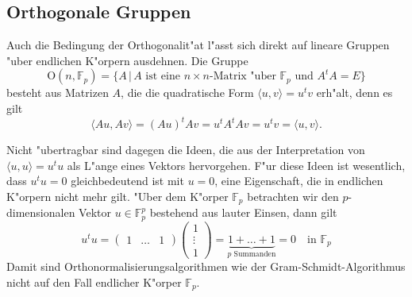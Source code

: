 \subsection{Orthogonale Gruppen}
Auch die Bedingung der Orthogonalit"at l"asst sich direkt auf lineare
Gruppen "uber endlichen K"orpern ausdehnen.
Die Gruppe
\[
\textrm{O}(n,\mathbb F_p)
=
\{
A\,|\,
\text{$A$ ist eine $n\times n$-Matrix "uber $\mathbb F_p$ und $A^tA=E$}
\}
\]
besteht aus Matrizen $A$, die die quadratische Form
$
\langle u,v\rangle
=
u^tv
$
erh"alt, denn es gilt
\[
\langle Au,Av\rangle
=
(Au)^t Av
=
u^tA^tAv
=
u^tv
=
\langle u,v\rangle.
\]

Nicht "ubertragbar sind dagegen die Ideen, die aus der Interpretation
von $\langle u,u\rangle=u^tu$ als L"ange eines Vektors hervorgehen.
F"ur diese Ideen ist wesentlich, dass $u^tu=0$ gleichbedeutend ist
mit $u=0$, eine Eigenschaft, die in endlichen K"orpern nicht mehr gilt.
"Uber dem K"orper $\mathbb F_p$ betrachten wir den $p$-dimensionalen
Vektor $u\in\mathbb F_p^p$ bestehend aus lauter Einsen, dann gilt
\[
u^tu
=
\begin{pmatrix}1&\dots&1\end{pmatrix}
\begin{pmatrix}1\\\vdots\\1\end{pmatrix}
=
\underbrace{1+\dots+1}_{\text{$p$ Summanden}}=0\quad\text{in $\mathbb F_p$}
\]
Damit sind Orthonormalisierungsalgorithmen wie der Gram-Schmidt-Algorithmus
nicht auf den Fall endlicher K"orper $\mathbb F_p$.

